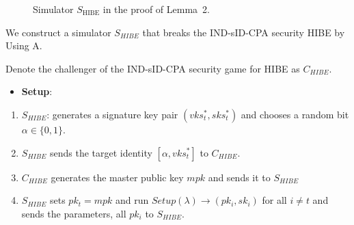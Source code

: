 \documentclass[
]{article}
\providecommand{\tightlist}{%
  \setlength{\itemsep}{0pt}\setlength{\parskip}{0pt}}
\begin{document}
\begin{figure}[ht]

\caption{Simulator $S_{\mathrm{HIBE}}$ in the proof of Lemma~2.}
\label{fig:lemma2-simulator}
\end{figure}


We construct a simulator \(S_{HIBE}\) that breaks the IND-sID-CPA
security HIBE by Using A.

Denote the challenger of the IND-sID-CPA security game for HIBE as
\(C_{HIBE}\).

\begin{itemize}
\tightlist
\item
  \textbf{Setup}:
\end{itemize}

\begin{enumerate}
\def\labelenumi{\arabic{enumi}.}
\tightlist
\item
  \(S_{HIBE}\): generates a signature key pair \((vks_t^*, sks_t^*)\)
  and chooses a random bit \(\alpha \in \{0, 1\}\).
\item
  \(S_{HIBE}\) sends the target identity \([{\alpha}, vks_t^*]\) to
  \(C_{HIBE}\).
\item
  \(C_{HIBE}\) generates the master public key \(mpk\) and sends it to
  \(S_{HIBE}\)
\item
  \(S_{HIBE}\) sets \(pk_t = mpk\) and run
  \(Setup(\lambda)\rightarrow (pk_i, sk_i)\) for all \(i \neq t\) and
  sends the parameters, all \(pk_i\) to \(S_{HIBE}\).
\end{enumerate}
\end{document}
